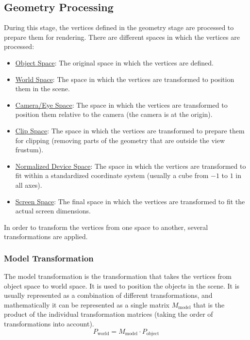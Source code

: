 \subsection{Geometry Processing}

During this stage, the vertices defined in the geometry stage are processed to prepare them for rendering. There are different spaces in which the vertices are processed:
\begin{itemize}
    \item \ul{Object Space}: The original space in which the vertices are defined.
    \item \ul{World Space}: The space in which the vertices are transformed to position them in the scene.
    \item \ul{Camera/Eye Space}: The space in which the vertices are transformed to position them relative to the camera (the camera is at the origin).
    \item \ul{Clip Space}: The space in which the vertices are transformed to prepare them for clipping (removing parts of the geometry that are outside the view frustum).
    \item \ul{Normalized Device Space}: The space in which the vertices are transformed to fit within a standardized coordinate system (usually a cube from $-1$ to $1$ in all axes).
    \item \ul{Screen Space}: The final space in which the vertices are transformed to fit the actual screen dimensions.
\end{itemize}

In order to transform the vertices from one space to another, several transformations are applied.

\subsubsection{Model Transformation}

The model transformation is the transformation that takes the vertices from object space to world space. It is used to position the objects in the scene. It is usually represented as a combination of different transformations, and mathematically it can be represented as a single matrix $M_{\text{model}}$ that is the product of the individual transformation matrices (taking the order of transformations into account).
\begin{equation*}
    P_{\text{world}} = M_{\text{model}} \cdot P_{\text{object}}
\end{equation*}

